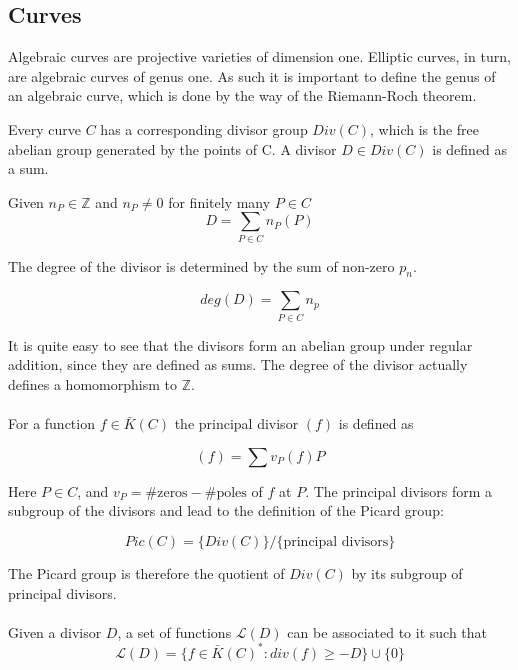 \subsection{Curves}
Algebraic curves are projective varieties of dimension one. Elliptic curves, in turn, are algebraic curves of genus one. As such it is important to define the genus of an algebraic curve, which is done by the way of the Riemann-Roch theorem.

Every curve $C$ has a corresponding divisor group $Div(C)$, which is the free abelian group generated by the points of C. A divisor $D\in Div(C)$ is defined as a sum.
\begin{defn} Given $n_P\in\mathbb{Z}$ and $n_P\neq 0$ for finitely many $P\in C$
	\begin{equation*}
	D=\sum_{P\in C}n_P(P)
	\end{equation*}
\end{defn}

The degree of the divisor is determined by the sum of non-zero $p_n$.
\begin{defn}
	\begin{equation*}
	deg(D)=\sum_{P\in C}n_p
	\end{equation*}
\end{defn}

It is quite easy to see that the divisors form an abelian group under regular addition, since they are defined as sums. The degree of the divisor actually defines a homomorphism to $\mathbb{Z}$.
\\
\\

For a function $f\in\bar{K}(C)$ the principal divisor $(f)$ is defined as
\begin{defn}
	\begin{equation*}
	(f)=\sum v_P(f)P
	\end{equation*}
\end{defn}
Here $P\in C$, and $v_P=\#\text{zeros}-\#\text{poles}$ of $f$ at $P$.
\newpage
The principal divisors form a subgroup of the divisors and lead to the definition of the Picard group:
\begin{defn}
	\begin{equation*}
	Pic(C)=\{Div(C)\}/\{\text{principal divisors}\}
	\end{equation*}
\end{defn}
The Picard group is therefore the quotient of $Div(C)$ by its subgroup of principal divisors.
\\
\\
Given a divisor $D$, a set of functions $\mathcal{L}(D)$ can be associated to it such that
\begin{equation*}
\mathcal{L}(D)=\{f\in\bar{K}(C)^*:div(f)\geq-D\}\cup\{0\}
\end{equation*}

